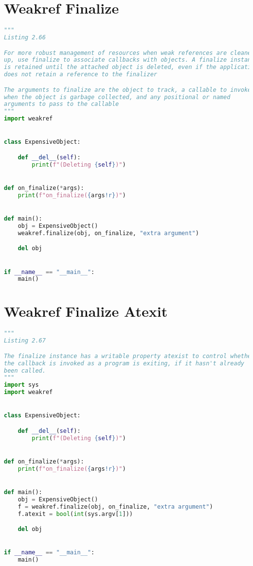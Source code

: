 \documentclass[a4paper,landscape]{report}
\begin{document}
\section{Weakref Finalize}
\begin{lstlisting}[language=Python]
"""
Listing 2.66

For more robust management of resources when weak references are cleaned
up, use finalize to associate callbacks with objects. A finalize instance
is retained until the attached object is deleted, even if the application
does not retain a reference to the finalizer

The arguments to finalize are the object to track, a callable to invoke
when the object is garbage collected, and any positional or named
arguments to pass to the callable
"""
import weakref


class ExpensiveObject:

    def __del__(self):
        print(f"(Deleting {self})")


def on_finalize(*args):
    print(f"on_finalize({args!r})")


def main():
    obj = ExpensiveObject()
    weakref.finalize(obj, on_finalize, "extra argument")

    del obj


if __name__ == "__main__":
    main()

\end{lstlisting}
\section{Weakref Finalize Atexit}
\begin{lstlisting}[language=Python]
"""
Listing 2.67

The finalize instance has a writable property atexist to control whether
the callback is invoked as a program is exiting, if it hasn't already
been called.
"""
import sys
import weakref


class ExpensiveObject:

    def __del__(self):
        print(f"(Deleting {self})")


def on_finalize(*args):
    print(f"on_finalize({args!r})")


def main():
    obj = ExpensiveObject()
    f = weakref.finalize(obj, on_finalize, "extra argument")
    f.atexit = bool(int(sys.argv[1]))

    del obj


if __name__ == "__main__":
    main()

\end{lstlisting}
\end{document}
